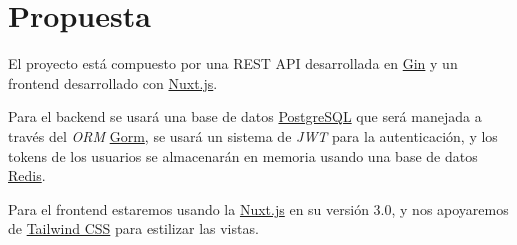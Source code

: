 \chapter{Propuesta}\label{chapter:proposal}

El proyecto está compuesto por una REST API desarrollada en \href{https://gin-gonic.com/}{Gin} y un frontend desarrollado con \href{https://nuxtjs.org/}{Nuxt.js}.
\newline

Para el backend se usará una base de datos \href{https://www.postgresql.org/}{PostgreSQL} que será manejada a través del \textit{ORM} \href{https://gorm.io/}{Gorm}, se usará un sistema de \textit{JWT} para la autenticación, y los tokens de los usuarios se almacenarán en memoria usando una base de datos \href{https://redis.io/}{Redis}.
\newline

Para el frontend estaremos usando la \href{https://nuxtjs.org/}{Nuxt.js} en su versión 3.0, y nos apoyaremos de \href{https://tailwindcss.com/}{Tailwind CSS} para estilizar las vistas.